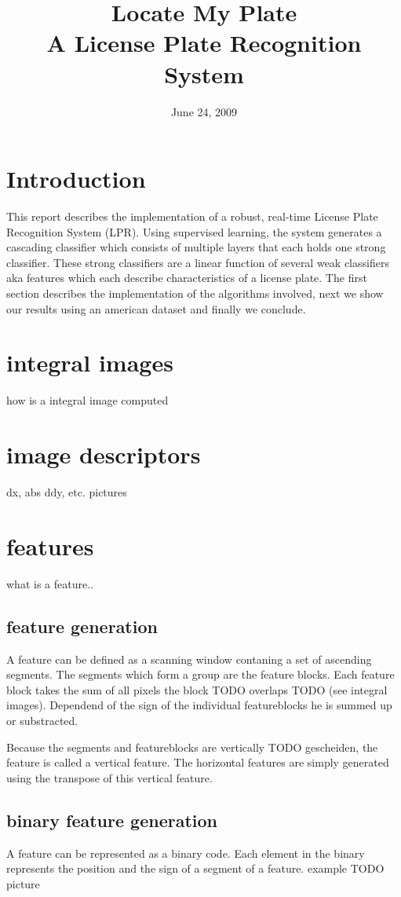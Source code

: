 \documentclass[a4paper,11pt]{article}
\title{Locate My Plate \\ A License Plate Recognition System}
\date{June 24, 2009}
\begin{document}
\maketitle
\section*{Introduction}
This report describes the implementation of a robust, real-time License Plate
Recognition System (LPR). Using supervised learning, the system generates a
cascading classifier which consists of multiple layers that each holds one
strong classifier. These strong classifiers are a linear function of several
weak classifiers aka features which each describe characteristics of a license
plate. The first section describes the implementation of the algorithms
involved, next we show our results using an american dataset and finally we
conclude.


\section{integral images}
how is a integral image computed

\section{image descriptors}
dx, abs ddy, etc.
pictures

\section{features}
what is a feature..

	\subsection{feature generation}
	A feature can be defined as a scanning window contaning a set of ascending
	segments. The segments which form a group are the feature blocks. Each
	feature block takes the sum of all pixels the block TODO overlaps TODO (see
	integral images). Dependend of the sign of the individual featureblocks he
	is summed up or substracted. 

	Because the segments and featureblocks are vertically TODO gescheiden, the
	feature is called a vertical feature.  The horizontal features are simply
	generated using the transpose of this vertical feature.

	\subsection{binary feature generation}
	A feature can be represented as a binary code. Each element in the binary
	represents the position and the sign of a segment of a feature.
	example TODO picture\\
\end{document}
